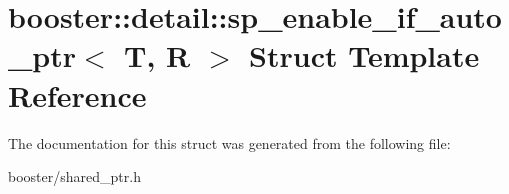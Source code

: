 \section{booster\-:\-:detail\-:\-:sp\-\_\-enable\-\_\-if\-\_\-auto\-\_\-ptr$<$ T, R $>$ Struct Template Reference}
\label{structbooster_1_1detail_1_1sp__enable__if__auto__ptr}


The documentation for this struct was generated from the following file\-:\begin{DoxyCompactItemize}
\item 
booster/shared\-\_\-ptr.\-h\end{DoxyCompactItemize}
